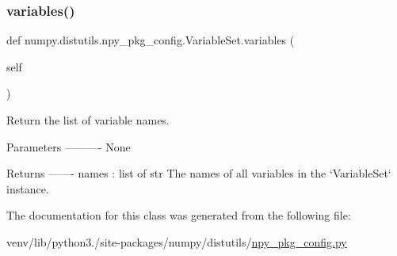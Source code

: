 \subsubsection{\texorpdfstring{variables()}{variables()}}
{\footnotesize\ttfamily def numpy.\+distutils.\+npy\+\_\+pkg\+\_\+config.\+Variable\+Set.\+variables (\begin{DoxyParamCaption}\item[{}]{self }\end{DoxyParamCaption})}

\begin{DoxyVerb}Return the list of variable names.

Parameters
----------
None

Returns
-------
names : list of str
    The names of all variables in the `VariableSet` instance.\end{DoxyVerb}
 

The documentation for this class was generated from the following file\+:\begin{DoxyCompactItemize}
\item 
venv/lib/python3./site-\/packages/numpy/distutils/\hyperlink{npy__pkg__config_8py}{npy\+\_\+pkg\+\_\+config.\+py}\end{DoxyCompactItemize}
